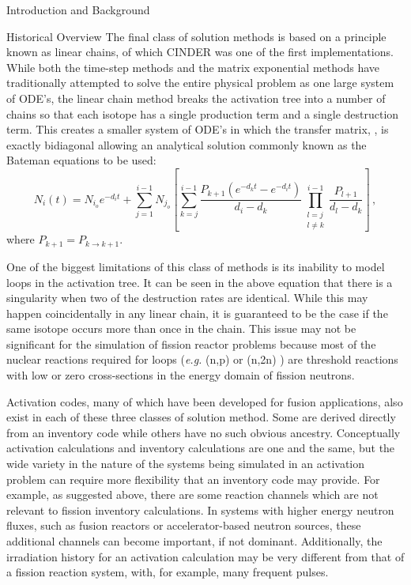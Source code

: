 \begin{chapter}{Introduction and Background}
\begin{section}{Historical Overview}
    The final class of solution methods is based on a principle known
    as linear chains, of which CINDER\cite{CINDER} was one of the
    first implementations.  While both the time-step methods and the
    matrix exponential methods have traditionally attempted to solve
    the entire physical problem as one large system of ODE's, the
    linear chain method breaks the activation tree into a number of
    chains so that each isotope has a single production term and a
    single destruction term.  This creates a smaller system of ODE's
    in which the transfer matrix, , is exactly bidiagonal
    allowing an analytical solution commonly known as the Bateman
    equations\cite{Bateman} to be used:
    \begin{equation}
      \label{intro.bateman}
      N_i(t) = N_{i_o}e^{-d_i t} + \sum_{j=1}^{i-1}N_{j_o}\left [
        \sum_{k=j}^{i-1}\frac{P_{k+1}(e^{-d_k t} - e^{-d_i t})}{d_i -
          d_k}\prod_{\substack{l=j\\l\neq k}}^{i-1}\frac{P_{l+1}}{d_l-d_k}\right] \, ,
    \end{equation}
    where $P_{k+1} = P_{k \rightarrow k+1}$.
  
    One of the biggest limitations of this class of methods is its
    inability to model loops in the activation tree.  It can be seen
    in the above equation that there is a singularity when two of the
    destruction rates are identical.  While this may happen
    coincidentally in any linear chain, it is guaranteed to be the
    case if the same isotope occurs more than once in the chain.  This
    issue may not be significant for the simulation of fission reactor
    problems because most of the nuclear reactions required for loops
    (\textsl{e.g.} (n,p) or (n,2n) ) are threshold reactions with low
    or zero cross-sections in the energy domain of fission neutrons.
  
    Activation codes, many of which have been developed for fusion
    applications, also exist in each of these three classes of
    solution method.  Some are derived directly from an inventory code
    while others have no such obvious ancestry.  Conceptually
    activation calculations and inventory calculations are one and the
    same, but the wide variety in the nature of the systems being
    simulated in an activation problem can require more flexibility
    that an inventory code may provide.  For example, as suggested
    above, there are some reaction channels which are not relevant to
    fission inventory calculations.  In systems with higher energy
    neutron fluxes, such as fusion reactors or accelerator-based
    neutron sources, these additional channels can become important,
    if not dominant.  Additionally, the irradiation history for an
    activation calculation may be very different from that of a
    fission reaction system, with, for example, many frequent pulses.
  

\end{section}
\end{chapter}
